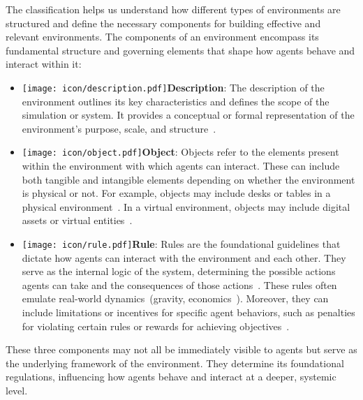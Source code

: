 The classification helps us understand how different types of environments are structured and define the necessary components for building effective and relevant environments.
The components of an environment encompass its fundamental structure and governing elements that shape how agents behave and interact within it:
\begin{itemize}
    \item \texttt{[image: icon/description.pdf]}\textbf{Description}: The description of the environment outlines its key characteristics and defines the scope of the simulation or system.
    It provides a conceptual or formal representation of the environment's purpose, scale, and structure~\cite{park2023choicematessupportingunfamiliaronline,10.1145/3613904.3642159}.
    \item \texttt{[image: icon/object.pdf]}\textbf{Object}: Objects refer to the elements present within the environment with which agents can interact.
    These can include both tangible and intangible elements depending on whether the environment is physical or not.
    For example, objects may include desks or tables in a physical environment~\cite{ahn2022icanisay}.
    In a virtual environment, objects may include digital assets or virtual entities~\cite{wang2023voyageropenendedembodiedagent}.
    \item \texttt{[image: icon/rule.pdf]}\textbf{Rule}: Rules are the foundational guidelines that dictate how agents can interact with the environment and each other. 
    They serve as the internal logic of the system, determining the possible actions agents can take and the consequences of those actions~\cite{hua2024warpeacewaragentlarge}.
    These rules often emulate real-world dynamics~(\eg gravity, economics~\cite{LENGNICK2013102}).
    Moreover, they can include limitations or incentives for specific agent behaviors, such as penalties for violating certain rules or rewards for achieving objectives~\cite{10.1145/3526113.3545616,basavatia2023complexworld}.
\end{itemize}

These three components may not all be immediately visible to agents but serve as the underlying framework of the environment.
They determine its foundational regulations, influencing how agents behave and interact at a deeper, systemic level.

